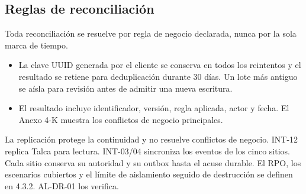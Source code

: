 \subsection{Reglas de reconciliación}
\label{sec:reglas-reconciliacion}

Toda reconciliación se resuelve por regla de negocio declarada, nunca por la sola marca de tiempo.

\begin{itemize}
  \item La clave UUID generada por el cliente se conserva en todos los reintentos y el resultado se retiene para deduplicación durante 30 días. Un lote más antiguo se aísla para revisión antes de admitir una nueva escritura.
  \item El resultado incluye identificador, versión, regla aplicada, actor y fecha. El Anexo 4-K muestra los conflictos de negocio principales.
\end{itemize}


La replicación protege la continuidad y no resuelve conflictos de negocio. INT-12 replica Talca para lectura. INT-03/04 sincroniza los eventos de los cinco sitios. Cada sitio conserva su autoridad y su outbox hasta el acuse durable. El RPO, los escenarios cubiertos y el límite de aislamiento seguido de destrucción se definen en 4.3.2. AL-DR-01 los verifica.
